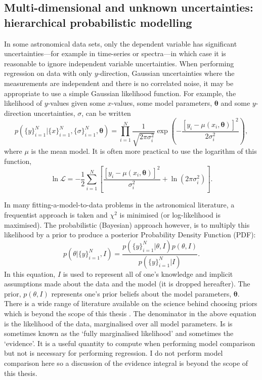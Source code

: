 \subsection{Multi-dimensional and unknown uncertainties: hierarchical
probabilistic modelling}
In some astronomical data sets, only the dependent variable has significant
uncertainties---for example in time-series or spectra---in which case it is
reasonable to ignore independent variable uncertainties.
When performing regression on data with only $y$-direction, Gaussian
uncertainties where the measurements are independent and there is no
correlated noise, it may be appropriate to use a simple Gaussian likelihood
function.
For example, the likelihood of $y$-values given some $x$-values, some model
parameters, $\mathbf{\theta}$ and some $y$-direction uncertainties, $\sigma$,
can be written
\begin{equation}
    p(\{y\}_{i=1}^N|\{x\}_{i=1}^N, \{\sigma\}_{i=1}^N, \mathbf{\theta})
    = \prod_{i=1}^N \frac{1}{\sqrt{2\pi\sigma_i^2}}
    \exp\left(-\frac{[y_i - \mu(x_i, \mathbf{\theta})]^2}{2\sigma_i^2}\right),
\end{equation}
where $\mu$ is the mean model.
It is often more practical to use the logarithm of this function,
\begin{equation}
    \ln\mathcal{L} =
    -\frac{1}{2} \sum_{i=1}^N \left[\frac{[y_i - \mu(x_i,
    \mathbf{\theta})]^2}{\sigma_i^2} +
    \ln\left(2\pi\sigma_i^2\right) \right].
\label{eq:lnlike_intro}
\end{equation}

In many fitting-a-model-to-data problems in the astronomical literature, a
frequentist approach is taken and $\chi^2$ is minimised (or log-likelihood is
maximised).
The probabilistic (Bayesian) approach however, is to multiply this likelihood
by a prior to produce a posterior Probability Density Function (PDF):
\begin{equation}
    p(\theta|\{y\}_{i=1}^N, I) = \frac{p(\{y\}_{i=1}^N|\theta, I)
    p(\theta, I)}{p(\{y\}_{i=1}^N|I)}.
\end{equation}
In this equation, $I$ is used to represent all of one's knowledge and
implicit assumptions made about the data and the model (it is dropped
hereafter).
The prior, $p(\theta, I)$ represents one's prior beliefs about the model
parameters, $\mathbf{\theta}$.
There is a wide range of literature available on the science behind choosing
priors which is beyond the scope of this thesis \citep[\eg][]{Kass1996,
Gelman2009, Vanderplas2014}.
The denominator in the above equation is the likelihood of the data,
marginalised over all model parameters.
Is is sometimes known as the `fully marginalised likelihood' and sometimes the
`evidence'.
It is a useful quantity to compute when performing model comparison but not
is necessary for performing regression.
I do not perform model comparison here so a discussion of the evidence
integral is beyond the scope of this thesis.

